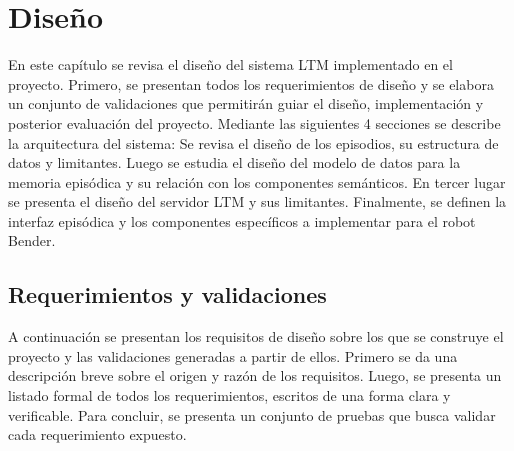 \chapter{Diseño}\label{chapter:diseno}

En este capítulo se revisa el diseño del sistema LTM implementado en el proyecto. Primero, se presentan todos los requerimientos de diseño y se elabora un conjunto de validaciones que permitirán guiar el diseño, implementación y posterior evaluación del proyecto. Mediante las siguientes 4 secciones se describe la arquitectura del sistema: Se revisa el diseño de los episodios, su estructura de datos y limitantes. Luego se estudia el diseño del modelo de datos para la memoria episódica y su relación con los componentes semánticos. En tercer lugar se presenta el diseño del servidor LTM y sus limitantes. Finalmente, se definen la interfaz episódica y los componentes específicos a implementar para el robot Bender.





\section{Requerimientos y validaciones}

A continuación se presentan los requisitos de diseño sobre los que se construye el proyecto y las validaciones generadas a partir de ellos. Primero se da una descripción breve sobre el origen y razón de los requisitos. Luego, se presenta un listado formal de todos los requerimientos, escritos de una forma clara y verificable. Para concluir, se presenta un conjunto de pruebas que busca validar cada requerimiento expuesto.

